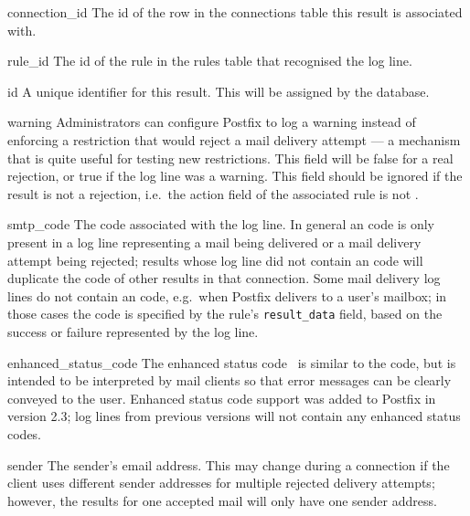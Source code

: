 \begin{boldeqlist}

    \item [connection\_id] The id of the row in the connections table this
        result is associated with.

    \item [rule\_id] The id of the rule in the rules table that recognised
        the log line.

    \item [id] A unique identifier for this result.  This will be assigned
        by the database.

    \item [warning] Administrators can configure Postfix to log a warning
        instead of enforcing a restriction that would reject a mail
        delivery attempt --- a mechanism that is quite useful for testing
        new restrictions.  This field will be false for a real rejection,
        or true if the log line was a warning.  This field should be
        ignored if the result is not a rejection, i.e.\ the action field of
        the associated rule is not .

    \item [smtp\_code] The  code associated with the log
        line.  In general an  code is only present in a log
        line representing a mail being delivered or a mail delivery attempt
        being rejected; results whose log line did not contain an
         code will duplicate the  code of other
        results in that connection.  Some mail delivery log lines do not
        contain an  code, e.g.\ when Postfix delivers to a
        user's mailbox; in those cases the  code is specified
        by the rule's \texttt{result\_data} field, based on the success or
        failure represented by the log line.

    \item [enhanced\_status\_code] The enhanced status code~\cite{RFC3463}
        is similar to the  code, but is intended to be
        interpreted by mail clients so that error messages can be clearly
        conveyed to the user.  Enhanced status code support was added to
        Postfix in version 2.3; log lines from previous versions will not
        contain any enhanced status codes.

    \item [sender] The sender's email address.  This may change during a
        connection if the client uses different sender addresses for
        multiple rejected delivery attempts; however, the results for one
        accepted mail will only have one sender address.


\end{boldeqlist}
